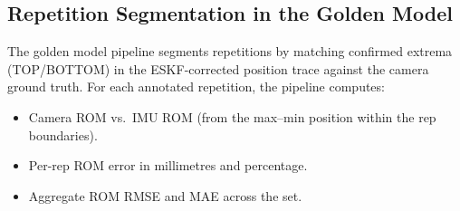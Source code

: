 \subsection{Repetition Segmentation in the Golden Model}

The golden model pipeline segments repetitions by matching confirmed extrema (TOP/BOTTOM) in the ESKF-corrected position trace against the camera ground truth.
For each annotated repetition, the pipeline computes:
\begin{itemize}[nosep]
  \item Camera ROM vs.\ IMU ROM (from the max--min position within the rep boundaries).
  \item Per-rep ROM error in millimetres and percentage.
  \item Aggregate ROM RMSE and MAE across the set.
\end{itemize}

